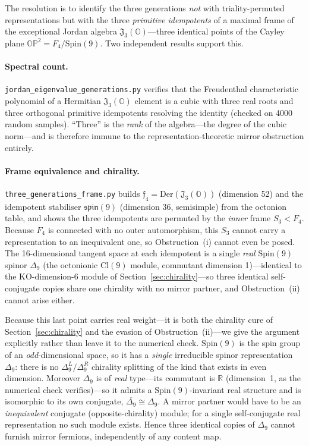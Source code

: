 \documentclass[11pt,a4paper]{article}
\theoremstyle{plain}
\newcommand{\JO}{\mathfrak{J}_3(\mathbb{O})}
\newcommand{\OP}{\mathbb{OP}^2}
\newcommand{\ffour}{\mathfrak{f}_4}
\newcommand{\Spin}{\mathrm{Spin}}
\newcommand{\Der}{\mathrm{Der}}
\newcommand{\Cl}{\mathrm{Cl}}
\newcommand{\code}[1]{\texttt{#1}}
\begin{document}
The resolution is to identify the three generations \emph{not} with
triality-permuted representations but with the three \emph{primitive idempotents}
of a maximal frame of the exceptional Jordan algebra $\JO$---three identical
points of the Cayley plane $\OP = F_4/\Spin(9)$. Two independent results support
this.

\paragraph{Spectral count.}
\code{jordan\_eigenvalue\_generations.py} verifies that the Freudenthal
characteristic polynomial of a Hermitian $\JO$ element is a cubic with three real
roots and three orthogonal primitive idempotents resolving the identity (checked
on 4000 random samples). ``Three'' is the \emph{rank} of the algebra---the degree
of the cubic norm---and is therefore immune to the representation-theoretic mirror
obstruction entirely.

\paragraph{Frame equivalence and chirality.}
\code{three\_generations\_frame.py} builds $\ffour = \Der(\JO)$ (dimension 52) and
the idempotent stabiliser $\mathfrak{spin}(9)$ (dimension 36, semisimple) from the
octonion table, and shows the three idempotents are permuted by the \emph{inner}
frame $S_3 < F_4$. Because $F_4$ is connected with no outer automorphism, this
$S_3$ cannot carry a representation to an inequivalent one, so Obstruction~(i)
cannot even be posed. The 16-dimensional tangent space at each idempotent is a
single \emph{real} $\Spin(9)$ spinor $\Delta_9$ (the octonionic $\Cl(9)$ module,
commutant dimension 1)---identical to the KO-dimension-6 module of
Section~\ref{sec:chirality}---so three identical self-conjugate copies share one
chirality with no mirror partner, and Obstruction~(ii) cannot arise either.

Because this last point carries real weight---it is both the chirality cure of
Section~\ref{sec:chirality} and the evasion of Obstruction~(ii)---we give the
argument explicitly rather than leave it to the numerical check. $\Spin(9)$ is the spin
group of an \emph{odd}-dimensional space, so it has a \emph{single} irreducible
spinor representation $\Delta_9$: there is no $\Delta_9^{L}/\Delta_9^{R}$ chirality
splitting of the kind that exists in even dimension. Moreover $\Delta_9$ is of
\emph{real} type---its commutant is $\mathbb{R}$ (dimension~1, as the numerical
check verifies)---so it admits a $\Spin(9)$-invariant real structure and is
isomorphic to its own conjugate, $\overline{\Delta_9} \cong \Delta_9$. A mirror
partner would have to be an \emph{inequivalent} conjugate (opposite-chirality)
module; for a single self-conjugate real representation no such module exists.
Hence three identical copies of $\Delta_9$ cannot furnish mirror fermions,
independently of any content map.
\end{document}
